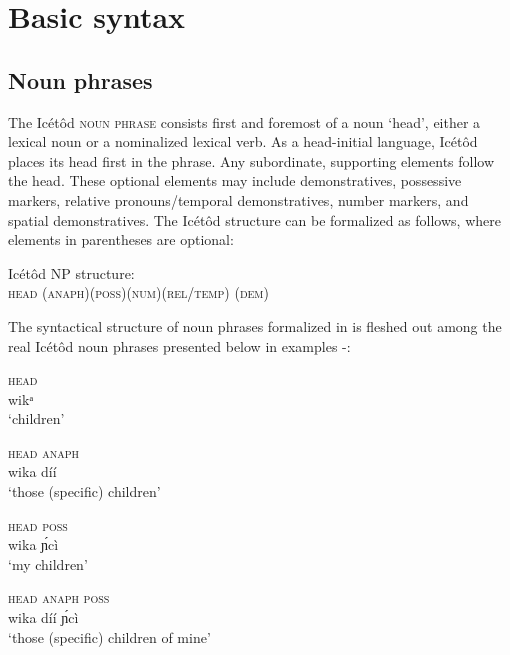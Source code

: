 \section{Basic syntax}\label{sec:10}



\subsection{Noun phrases}\label{sec:10.1}


The Icétôd \textsc{noun phrase} consists first and foremost of a noun ‘head’, either a lexical noun or a nominalized lexical verb. As a head-initial language, Icétôd places its  head first in the phrase. Any subordinate, supporting elements follow the head. These optional elements may include  demonstratives, possessive markers, relative pronouns/temporal demonstratives, number markers, and spatial demonstratives. The Icétôd  structure can be formalized as follows, where elements in parentheses are optional:


\newpage 
\ea\label{ex:syn:1}
Icétôd NP structure: \\
\textsc{head (anaph)(poss)(num)(rel/temp) (dem)}
\z


The syntactical structure of noun phrases formalized in  is fleshed out among the real Icétôd noun phrases presented below in examples -:




\ea\label{ex:syn:2}
\gll \textsc{head} \\
 wikᵃ    \\
\glt ‘children’ 
\z





\ea\label{ex:syn:3}
\gll \textsc{head} \textsc{anaph} \\
wika díí    \\
\glt ‘those (specific) children’ 
\z





\ea\label{ex:syn:4}
\gll \textsc{head} \textsc{poss} \\
wika \'{ɲ}cì    \\
\glt ‘my children’ 
\z





\ea\label{ex:syn:5}
\gll \textsc{head} \textsc{anaph} \textsc{poss} \\
wika díí \'{ɲ}cì    \\
\glt ‘those (specific) children of mine’ 
\z





